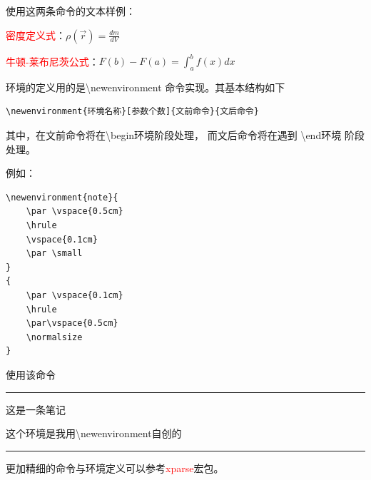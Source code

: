 \documentclass[UTF8]{ctexart}
\begin{document}
	\newcommand{\density}{\rho}
	\newcommand{\red}[1]{\textcolor{red}{#1}}
	\newcommand{\myint}[3]{\displaystyle\int_{#1}^{#2} #3}
	使用这两条命令的文本样例：

	\begin{center}
		\red{密度定义式}：$\density(\vec{r}) = \frac{dm}{dV}$

		\red{牛顿-莱布尼茨公式}：$F(b)-F(a)=\myint{a}{b}{f(x)dx}$
	\end{center}

	环境的定义用的是\textbackslash newenvironment 命令实现。其基本结构如下
	\begin{center}
		\begin{BVerbatim}
\newenvironment{环境名称}[参数个数]{文前命令}{文后命令}
		\end{BVerbatim}
	\end{center}
	
	其中，在文前命令将在\textbackslash begin{环境}阶段处理，
	而文后命令将在遇到 \textbackslash end{环境} 阶段处理。

	例如：

	\begin{center}
		\begin{BVerbatim}
\newenvironment{note}{
	\par \vspace{0.5cm}
	\hrule
	\vspace{0.1cm}
	\par \small
}
{
	\par \vspace{0.1cm}
	\hrule
	\par\vspace{0.5cm}
	\normalsize
}
		\end{BVerbatim}
	\end{center}

	使用该命令
\newenvironment{note}{
	\par \vspace{0.5cm}
	\hrule
	\vspace{0.1cm}
	\par \small
}
{
	\par \vspace{0.1cm}
	\hrule
	\par\vspace{0.5cm}
	\normalsize
}
	\begin{note}
		这是一条笔记

		这个环境是我用\textbackslash newenvironment自创的
	\end{note}

	更加精细的命令与环境定义可以参考\red{xparse}宏包。
\end{document}
